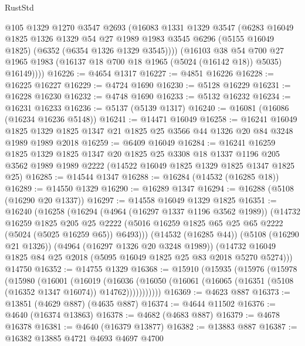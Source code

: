\begin{lexlean}{RustStd}
\begin{coremodule}
          @105
          @1329
          @1270
          @3547
          @2693
          (@16083
            @1331
            @1329
            @3547
            (@6283
              @16049
              @1825
              @1326
              @1329
              @54
              @27
              @1989
              @1983
              @3545
              @6296
              (@5155 @16049 @1825)
              (@6352 (@6354 @1326 @1329 @3545))))
          (@16103
            @38
            @54
            @700
            @27
            @1965
            @1983
            (@16137 @18 @700 @18 @1965 (@5024 (@16142 @18)) @5035)
            @16149))))
@16226 := @4654 @1317
@16227 := @4851 @16226
@16228 := @16225 @16227
@16229 := @4724 @1690
@16230 := @5128 @16229
@16231 := @16228 @16230
@16232 := @4748 @1690
@16233 := @5132 @16232
@16234 := @16231 @16233
@16236 := @5137 (@5139 @1317)
@16240 := @16081 (@16086 (@16234 @16236 @5148))
@16241 := @14471 @16049
@16258 := @16241
    @16049
    @1825
    @1329
    @1825
    @1347
    @21
    @1825
    @25
    @3566
    @44
    @1326
    @20
    @84
    @3248
    @1989
    @1989
    @2018
@16259 := @6409 @16049
@16284 := @16241
    @16259
    @1825
    @1329
    @1825
    @1347
    @20
    @1825
    @25
    @3308
    @18
    @1337
    @1196
    @205
    @3562
    @1989
    @1989
    @2222
    (@14522 @16049 @1825 @1329 @1825 @1347 @1825 @25)
@16285 := @14544 @1347
@16288 := @16284 (@14532 (@16285 @18))
@16289 := @14550 @1329
@16290 := @16289 @1347
@16294 := @16288 (@5108 (@16290 @20 @1337))
@16297 := @14558 @16049 @1329 @1825
@16351 := @16240
    (@16258
      (@16294
        (@4964 (@16297 @1337 @1196 @3562 @1989))
        (@14732
          @16259
          @1825
          @205
          @25
          @2222
          (@5016 @16259 @1825 @65 @25 @65 @2222 (@5024 (@5025 @16259 @65)) @6493)))
      (@14532 (@16285 @44))
      (@5108 (@16290 @21 @1326))
      (@4964 (@16297 @1326 @20 @3248 @1989))
      (@14732 @16049 @1825 @84 @25 @2018 (@5095 @16049 @1825 @25 @83 @2018 @5270 @5274)))
    @14750
@16352 := @14755 @1329
@16368 := @15910
    (@15935
      (@15976
        (@15978
          (@15980
            (@16001
              (@16019
                (@16036
                  (@16050 (@16061 (@16065 (@16351 (@5108 (@16352 @1347 @16074)) @14762)))))))))))
@16369 := @4623 @887
@16373 := @13851 (@4629 @887) (@4635 @887)
@16374 := @4644 @11502
@16376 := @4640 (@16374 @13863)
@16378 := @4682 (@4683 @887)
@16379 := @4678 @16378
@16381 := @4640 (@16379 @13877)
@16382 := @13883 @887
@16387 := @16382 @13885 @4721 @4693 @4697 @4700

\end{coremodule}
\end{lexlean}
